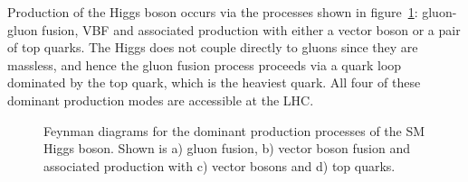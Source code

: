Production of the Higgs boson occurs via the processes shown in
figure~\ref{fig:SMFeynmanDiagrams}: gluon-gluon fusion, \ac{VBF} and associated
production with either a vector boson or a pair of top quarks. The Higgs does
not couple directly to gluons since they are massless, and hence the gluon
fusion process proceeds via a quark loop dominated by the top quark, which is
the heaviest quark. All four of these dominant production modes are
accessible at the LHC. 

\begin{figure}[htbp]

\caption[Feynman diagrams for the dominant production processes of the SM Higgs
boson.]{Feynman diagrams for the dominant production processes of the SM Higgs
boson. Shown is a) gluon fusion, b) vector boson fusion and
associated production with c) vector bosons and d) top quarks.}
\label{fig:SMFeynmanDiagrams}
\end{figure}

